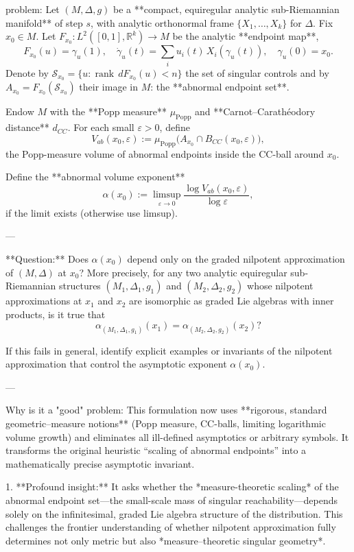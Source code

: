 problem:  
Let \((M,\Delta,g)\) be a **compact, equiregular analytic sub-Riemannian manifold** of step \(s\), with analytic orthonormal frame \(\{X_1,\ldots,X_k\}\) for \(\Delta\).  
Fix \(x_0\in M\). Let \(F_{x_0}:L^2([0,1],\mathbb{R}^k)\to M\) be the analytic **endpoint map**,  
\[
F_{x_0}(u)=\gamma_u(1),\quad \dot{\gamma}_u(t)=\sum_i u_i(t)\,X_i(\gamma_u(t)),\quad \gamma_u(0)=x_0.
\]  
Denote by \(\mathcal S_{x_0}=\{u:\operatorname{rank}\,dF_{x_0}(u)<n\}\) the set of singular controls and by \(A_{x_0}=F_{x_0}(\mathcal S_{x_0})\) their image in \(M\): the **abnormal endpoint set**.

Endow \(M\) with the **Popp measure** \(\mu_{\mathrm{Popp}}\) and **Carnot–Carathéodory distance** \(d_{CC}\).  
For each small \(\varepsilon>0\), define  
\[
V_{ab}(x_0,\varepsilon):=\mu_{\mathrm{Popp}}\bigl(A_{x_0}\cap B_{CC}(x_0,\varepsilon)\bigr),
\]
the Popp-measure volume of abnormal endpoints inside the CC-ball around \(x_0\).

Define the **abnormal volume exponent**
\[
\alpha(x_0):=\limsup_{\varepsilon\to0}\frac{\log V_{ab}(x_0,\varepsilon)}{\log \varepsilon},
\]
if the limit exists (otherwise use limsup).

---

**Question:**  
Does \(\alpha(x_0)\) depend only on the graded nilpotent approximation of \((M,\Delta)\) at \(x_0\)?  
More precisely, for any two analytic equiregular sub-Riemannian structures \((M_1,\Delta_1,g_1)\) and \((M_2,\Delta_2,g_2)\) whose nilpotent approximations at \(x_1\) and \(x_2\) are isomorphic as graded Lie algebras with inner products, is it true that
\[
\alpha_{(M_1,\Delta_1,g_1)}(x_1)=\alpha_{(M_2,\Delta_2,g_2)}(x_2)?
\]

If this fails in general, identify explicit examples or invariants of the nilpotent approximation that control the asymptotic exponent \(\alpha(x_0)\).  

---

Why is it a "good" problem:  
This formulation now uses **rigorous, standard geometric–measure notions** (Popp measure, CC-balls, limiting logarithmic volume growth) and eliminates all ill-defined asymptotics or arbitrary symbols. It transforms the original heuristic “scaling of abnormal endpoints” into a mathematically precise asymptotic invariant.  

1. **Profound insight:**  
   It asks whether the *measure-theoretic scaling* of the abnormal endpoint set—the small-scale mass of singular reachability—depends solely on the infinitesimal, graded Lie algebra structure of the distribution. This challenges the frontier understanding of whether nilpotent approximation fully determines not only metric but also *measure–theoretic singular geometry*.  


